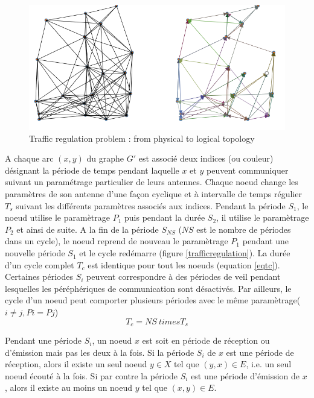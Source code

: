 \documentclass[sigconf]{acmart}
\begin{document}
\begin{figure}[h]
\centering
\includegraphics[width=\columnwidth]{logicaltopology.png}
\caption{Traffic regulation problem : from physical to logical topology}
\label{logicaltopology}
\end{figure}


A chaque arc $(x,y)$ du graphe $G'$ est associé deux indices (ou couleur) désignant la période de temps pendant laquelle $x$ et $y$ peuvent communiquer suivant un paramétrage particulier de leurs antennes. Chaque noeud change les paramètres de son antenne d'une façon cyclique et à intervalle de temps régulier $T_s$ suivant les différents paramètres associés aux indices. Pendant la période $S_1$, le noeud utilise le paramètrage $P_1$ puis pendant la durée $S_2$, il utilise le paramètrage $P_2$ et ainsi de suite. A la fin de la période $S_{NS}$ ($NS$ est le nombre de périodes dans un cycle), le noeud reprend de nouveau le paramètrage $P_1$ pendant une nouvelle période $S_1$ et le cycle redémarre (figure \ref{trafficregulation}). La durée d'un cycle complet $T_{c}$ est identique pour tout les noeuds (equation \ref{eqtc}). Certaines périodes $S_i$ peuvent correspondre à des périodes de veil pendant lesquelles les péréphériques de communication sont désactivés. Par ailleurs, le cycle d'un noeud peut comporter plusieurs périodes avec le même paramètrage($i\neq j,  Pi=Pj$)
\begin{dmath}
T_c=NS \ times T_s
\label{eqtc}
\end{dmath}

Pendant une période $S_i$, un noeud $x$ est soit en période de réception ou d'émission mais pas les deux à la fois. Si la période $S_i$ de $x$ est une période de réception, alors il existe un seul noeud $y\in X$ tel que $(y,x)\in E$, i.e. un seul noeud écouté à la fois. Si par contre la période $S_i$ est une période d'émission de $x$, alors il existe au moins un noeud $y$ tel que $(x,y)\in E$.
\end{document}
